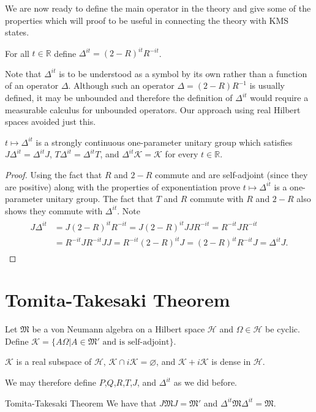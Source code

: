 We are now ready to define the main operator in the theory and give some of the properties which will proof to be useful in connecting the theory with KMS states.

\begin{definition}
For all $t\in\mathbb{R}$ define $\Delta^{it} = (2-R)^{it}R^{-it}$.
\end{definition}

Note that $\Delta^{it}$ is to be understood as a symbol by its own rather than a function of an operator $\Delta$. Although such an operator $\Delta=(2-R)R^{-1}$ is usually defined, it may be unbounded and therefore the definition of $\Delta^{it}$ would require a measurable calculus for unbounded operators. Our approach using real Hilbert spaces avoided just this.

\begin{theorem}
$t\mapsto\Delta^{it}$ is a strongly continuous one-parameter unitary group which satisfies $J\Delta^{it}=\Delta^{it}J$, $T\Delta^{it}=\Delta^{it}T$, and $\Delta^{it}\mathcal{K}=\mathcal{K}$ for every $t\in\mathbb{R}$.
\end{theorem}

\begin{proof}
Using the fact that $R$ and $2-R$ commute and are self-adjoint (since they are positive) along with the properties of exponentiation prove $t\mapsto\Delta^{it}$ is a one-parameter unitary group. The fact that $T$ and $R$ commute with $R$ and $2-R$ also shows they commute with $\Delta^{it}$. Note
\begin{align}
\begin{split}
J\Delta^{it}&=J(2-R)^{it}R^{-it}=J(2-R)^{it}JJR^{-it}=R^{-it}JR^{-it} \\
&=R^{-it}JR^{-it}JJ=R^{-it}(2-R)^{it}J=(2-R)^{it} R^{-it}J=\Delta^{it}J.
\end{split}
\end{align}
\end{proof}

\section{Tomita-Takesaki Theorem}

Let $\mathfrak{M}$ be a von Neumann algebra on a Hilbert space $\mathcal{H}$ and $\Omega\in\mathcal{H}$ be cyclic. Define $\mathcal{K}=\{A\Omega|A\in\mathfrak{M}'\text{ and is self-adjoint}\}$.

\begin{theorem}
$\mathcal{K}$ is a real subspace of $\mathcal{H}$, $\mathcal{K}\cap i\mathcal{K}=\varnothing$, and $\mathcal{K}+i\mathcal{K}$ is dense in $\mathcal{H}$. 
\end{theorem}

We may therefore define $P$,$Q$,$R$,$T$,$J$, and $\Delta^{it}$ as we did before.

\begin{theorem}{Tomita-Takesaki Theorem}
We have that $J\mathfrak{M}J=\mathfrak{M}'$ and $\Delta^{it}\mathfrak{M}\Delta^{it}=\mathfrak{M}$.
\end{theorem}